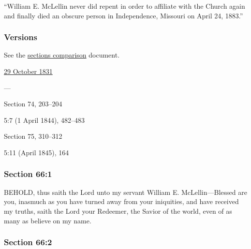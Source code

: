 			``William E. McLellin never did repent in order to affiliate with the Church again and finally died an obscure person in Independence, Missouri on April 24, 1883.''
			
	\subsubsection{Versions}
		\label{DC66-V}
		
		See the \href{https://drive.google.com/file/d/1goAvNz8jS4R8slYfMG_db55Ty2z_vmgK/view?usp=sharing}{sections comparison} document.
	
		\begin{compactdesc}
			\item[JSP] \hyperref[EMS-1831-JS-29-OCT-1831]{29 October 1831}
			\item[BC] ---
			\item[DC 1835] Section 74, 203--204
			\item[TS] 5:7 (1 April 1844), 482--483
			\item[DC 1844] Section 75, 310--312
			\item[MS] 5:11 (April 1845), 164
		\end{compactdesc}

	\subsubsection{Section 66:1} %
		\label{DC66-1}

		BEHOLD, thus saith the Lord unto my servant William E. McLellin---Blessed are you, inasmuch as you have turned away from your iniquities, and have received my truths, saith the Lord your Redeemer, the Savior of the world, even of as many as believe on my name.


	\subsubsection{Section 66:2} %
		\label{DC66-2}

